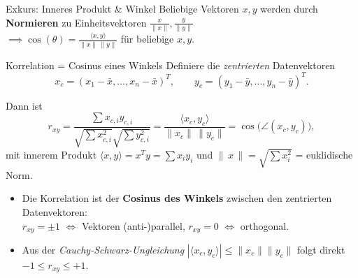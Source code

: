 \documentclass[
  10pt,
  ignorenonframetext,
]{beamer}
\providecommand{\tightlist}{%
  \setlength{\itemsep}{0pt}\setlength{\parskip}{0pt}}
\begin{document}
\begin{frame}{Exkurs: Inneres Produkt \& Winkel}
Beliebige Vektoren \(x, y\) werden durch \textbf{Normieren} zu
Einheitsvektoren
\(\tfrac{x}{\lVert x \rVert}, \tfrac{y}{\lVert y \rVert}\)\\
\(\implies \cos(\theta) = \tfrac{\langle x, y \rangle}{\lVert x \rVert \, \lVert y \rVert}\)
für beliebige \(x, y\). \columnsend
\end{frame}

\begin{frame}{Korrelation = Cosinus eines Winkels}
\protect\hypertarget{korrelation-cosinus-eines-winkels}{}
Definiere die \emph{zentrierten} Datenvektoren \[
x_c = (x_1-\bar{x},\ldots,x_n-\bar{x})^T, \qquad
y_c = (y_1-\bar{y},\ldots,y_n-\bar{y})^T.
\]

Dann ist \[
r_{xy} = \frac{\sum x_{c,i} y_{c,i}}{\sqrt{\sum x_{c,i}^2}\sqrt{\sum y_{c,i}^2}} = \frac{\langle x_c, y_c\rangle}{\lVert x_c \rVert \, \lVert y_c \rVert} = \cos\big(\angle(x_c, y_c)\big),
\] mit innerem Produkt \(\langle x, y \rangle = x^T y = \sum x_i y_i\)
und \(\lVert\,x\,\rVert = \sqrt{\sum x_i^2}\) = euklidische Norm.

\begin{itemize}
\tightlist
\item
  Die Korrelation ist der \textbf{Cosinus des Winkels} zwischen den
  zentrierten Datenvektoren:\\
  \(r_{xy} = \pm 1\) \(\Leftrightarrow\) Vektoren (anti-)parallel,
  \(r_{xy} = 0\) \(\Leftrightarrow\) orthogonal.
\item
  Aus der \emph{Cauchy-Schwarz-Ungleichung}
  \(|\langle x_c, y_c \rangle| \leq \lVert x_c \rVert \lVert y_c \rVert\)
  folgt direkt \(-1 \leq r_{xy} \leq +1\).
\end{itemize}

\scriptsize\normalsize
\end{frame}
\end{document}
